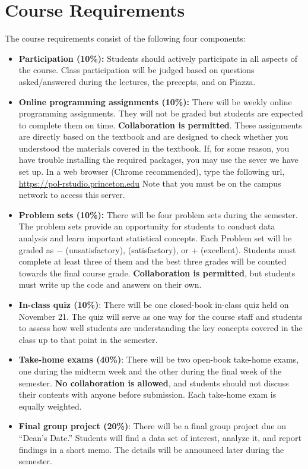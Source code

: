 \documentclass[11pt]{article}
\begin{document}
\section{Course Requirements}

The course requirements consist of the following four components:

\begin{itemize}
\item {\bf Participation (10\%):} Students should actively participate
  in all aspects of the course.  Class participation will be judged
  based on questions asked/answered during the lectures, the precepts,
  and on \textsf{Piazza}.

\item {\bf Online programming assignments (10\%):} There will be
  weekly online programming assignments.  They will not be graded but
  students are expected to complete them on time. {\bf Collaboration
    is permitted}. These assignments are directly based on the
  textbook and are designed to check whether you understood the
  materials covered in the textbook. If, for some reason, you have
  trouble installing the required \R{} packages, you may use the
  \Rst{} sever we have set up.  In a web browser (Chrome recommended),
  type the following url, \url{https://pol-rstudio.princeton.edu} Note
  that you must be on the campus network to access this server.

\item {\bf Problem sets (10\%):} There will be four problem sets
  during the semester.  The problem sets provide an opportunity for
  students to conduct data analysis and learn important statistical
  concepts.  Each Problem set will be graded as \checkmark$-$
  (unsatisfactory), \checkmark (satisfactory), or \checkmark+
  (excellent). Students must complete at least three of them and the
  best three grades will be counted towards the final course
  grade. {\bf Collaboration is permitted}, but students must write up
  the code and answers on their own.

\item {\bf In-class quiz (10\%)}: There will be one closed-book
  in-class quiz held on November 21.  The quiz will serve as one way
  for the course staff and students to assess how well students are
  understanding the key concepts covered in the class up to that point
  in the semester.

\item {\bf Take-home exams (40\%)}: There will be two open-book
  take-home exams, one during the midterm week and the other during
  the final week of the semester. {\bf No collaboration is allowed},
  and students should not discuss their contents with anyone before
  submission.  Each take-home exam is equally weighted.

\item {\bf Final group project (20\%)}: There will be a final group
  project due on ``Dean's Date.'' Students will find a data set of
  interest, analyze it, and report findings in a short memo.  The
  details will be announced later during the semester.

\end{itemize}
\end{document}
